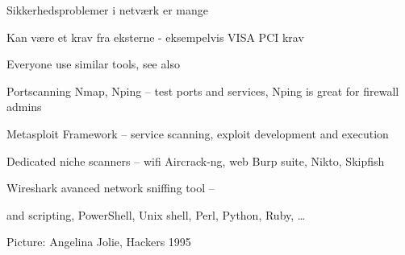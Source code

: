 \documentclass[Screen16to9,17pt]{foils}
\begin{document}


\begin{list1}
\item Sikkerhedsproblemer i netværk er mange
\item Kan være et krav fra eksterne - eksempelvis VISA PCI krav
\end{list1}




\begin{list2}
\item Everyone use similar tools, see also 
\item Portscanning Nmap, Nping -- test ports and services, Nping is great for firewall admins 
\item Metasploit Framework -- service scanning, exploit development and execution 
\item Dedicated niche scanners -- wifi Aircrack-ng, web Burp suite, Nikto, Skipfish 
\item Wireshark avanced network sniffing tool -- 
\item and scripting, PowerShell, Unix shell, Perl, Python, Ruby, \ldots
\end{list2}

Picture: Angelina Jolie, Hackers 1995




\end{document}

